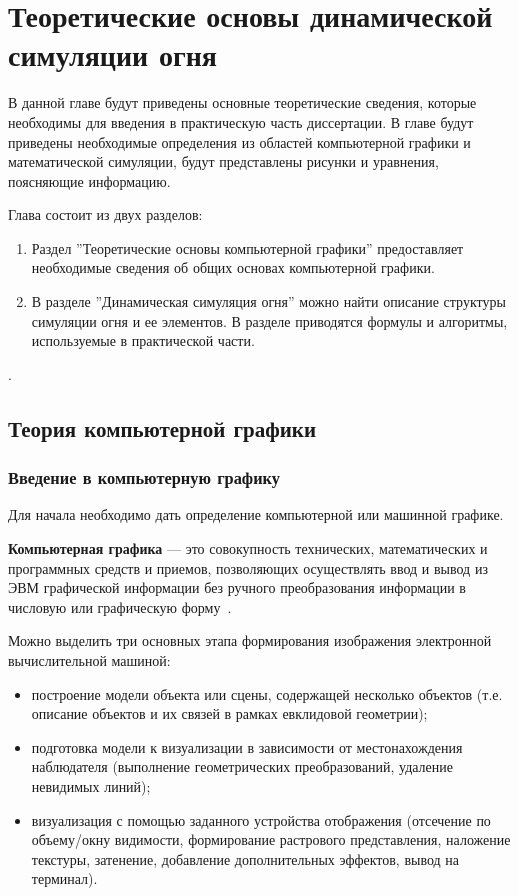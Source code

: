 \chapter{Теоретические основы динамической симуляции огня}

В данной главе будут приведены основные теоретические сведения, которые
необходимы для введения в практическую часть диссертации. В главе будут
приведены необходимые определения из областей компьютерной графики и
математической симуляции, будут представлены рисунки и уравнения, поясняющие
информацию.

Глава состоит из двух разделов:
\begin{enumerate}
    \item Раздел ''Теоретические основы компьютерной графики'' предоставляет
        необходимые сведения об общих основах компьютерной графики.
    \item В разделе ''Динамическая симуляция огня'' можно найти описание\break{}
        структуры симуляции огня и ее элементов. В разделе приводятся формулы и
        алгоритмы, используемые в практической части.
\end{enumerate}.

\section{Теория компьютерной графики}

\subsection{Введение в компьютерную графику}

Для начала необходимо дать определение компьютерной или машинной графике.

\textbf{Компьютерная графика} --- это совокупность технических, математических и
программных средств и приемов, позволяющих осуществлять ввод и вывод из ЭВМ
графической информации без ручного преобразования информации в числовую или
графическую форму~\cite{SamalGraphics}.

Можно выделить три основных этапа формирования изображения электронной
вычислительной машиной:
\begin{itemize}
    \item построение модели объекта или сцены, содержащей несколько объектов
        (т\@.е\@. описание объектов и их связей в рамках евклидовой геометрии);
    \item подготовка модели к визуализации в зависимости от местонахождения
        наблюдателя (выполнение геометрических преобразований, удаление
        невидимых линий);
    \item визуализация с помощью заданного устройства отображения (отсечение по
        объему/окну видимости, формирование растрового представления, наложение
        текстуры, затенение, добавление дополнительных эффектов, вывод на
        терминал).
\end{itemize}


